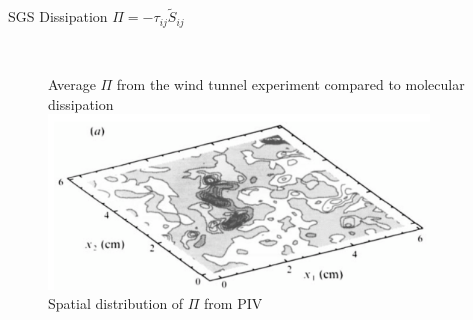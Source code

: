 \begin{frame}{SGS Dissipation $\Pi = -\tau_{ij}\widetilde{S}_{ij}$}
\begin{columns}
\begin{column}{.5\textwidth}
\begin{figure}
      ~\\\tiny{Average $\Pi$ from the wind tunnel experiment compared to molecular dissipation}
      ~\\\includegraphics[width=0.9\textwidth]{apriori8}
      ~\\\tiny{Spatial distribution of $\Pi$ from PIV}
      \end{figure}
    \end{column}
  \end{columns}
\end{frame}
